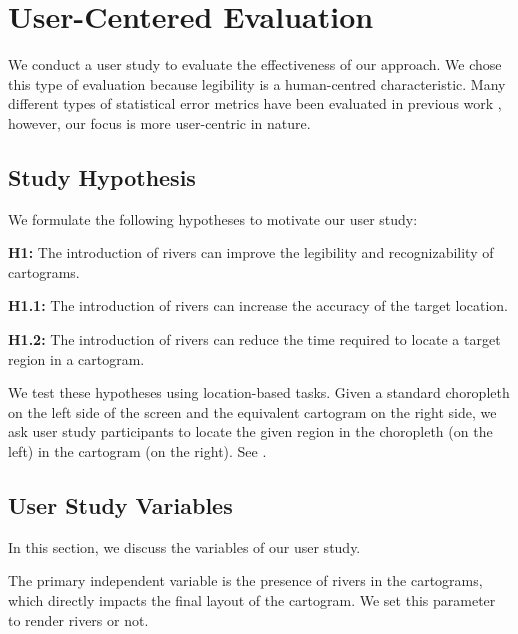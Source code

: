 \newcommand{\pCount}{24 }
\section{User-Centered Evaluation}

We conduct a user study to evaluate the effectiveness of our approach. We chose this type of evaluation because legibility is a human-centred characteristic. Many different types of statistical error metrics have been evaluated in previous work \cite{nusrat2016State}, however, our focus is more user-centric in nature.

\subsection{Study Hypothesis}

We formulate the following hypotheses to motivate our user study:

\textbf{H1:} The introduction of rivers can improve the legibility and recognizability of cartograms.

\textbf{H1.1:} The introduction of rivers can increase the accuracy of the target location.

\textbf{H1.2:} The introduction of rivers can reduce the time required to locate a target region in a cartogram.

We test these hypotheses using location-based tasks. Given a standard choropleth on the left side of the screen and the equivalent cartogram on the right side, we ask user study participants to locate the given region in the choropleth (on the left) in the cartogram (on the right). See .

\subsection{User Study Variables}

In this section, we discuss the variables of our user study.

The primary independent variable is the presence of rivers in the cartograms, which directly impacts the final layout of the cartogram. We set this parameter to render rivers or not.




